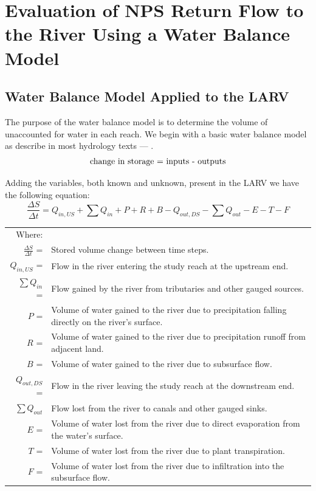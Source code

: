 \renewcommand{\thechapter}{4}
\chapter{Evaluation of NPS Return Flow to the River Using a Water Balance Model}
\label{chap:WaterBalanceModel}

\begin{linenumbers}
\section{Water Balance Model Applied to the LARV}
\label{sec:AppliedWaterModel}

The purpose of the water balance model is to determine the volume of unaccounted for water in each reach.  We begin with a basic water balance model as describe in most hydrology texts --- \parencite{wanielista1997}.
\begin{equation}
	\textnormal{change in storage = inputs - outputs} \nonumber
\end{equation}

Adding the variables, both known and unknown, present in the LARV we have the following equation:
\begin{equation}
\label{eq:water1}
	\frac{\Delta S}{\Delta t} = Q_{in,US} + \sum Q_{in} + P + R + B - Q_{out,DS} - \sum Q_{out} - E - T - F 
\end{equation}
\begin{longtable}{rl}
	Where: \\
	$\frac{\Delta S}{\Delta t}$ =&Stored volume change between time steps.\\
	$ Q_{in,US} $ = & Flow in the river entering the study reach at the upstream end.\\
	$ \sum Q_{in} $ = & Flow gained by the river from tributaries and other gauged sources.\\
	$ P $ = & Volume of water gained to the river due to precipitation falling directly on the river's surface.\\
	$ R $ = & Volume of water gained to the river due to precipitation runoff from adjacent land. \\
	$ B $ = & Volume of water gained to the river due to subsurface flow. \\
	$ Q_{out,DS} $ = & Flow in the river leaving the study reach at the downstream end.\\
	$ \sum Q_{out} $ & Flow lost from the river to canals and other gauged sinks.\\
	$ E $ = & Volume of water lost from the river due to direct evaporation from the water's surface.\\
	$ T $ = & Volume of water lost from the river due to plant transpiration.\\
	$ F $ = & Volume of water lost from the river due to infiltration into the subsurface flow.\\
\end{longtable}


\end{linenumbers}
